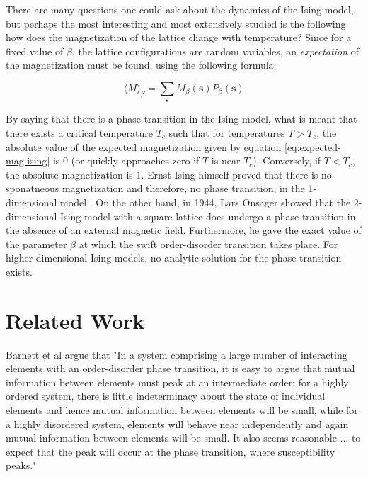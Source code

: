 \documentclass[12pt]{article}
\begin{document}
There are many questions one could ask about the dynamics of the Ising model, but perhaps the most interesting and most extensively studied is the following: how does the magnetization of the lattice change with temperature? Since for a fixed value of $\beta$, the lattice configurations are random variables, an \textit{expectation} of the magnetization must be found, using the following formula:

\begin{equation}
\langle M \rangle_\beta = \sum_{\boldsymbol{s}} M_\beta(\boldsymbol{s}) P_\beta(\boldsymbol{s})
\label{eq:expected-mag-ising}
\end{equation}

By saying that there is a phase transition in the Ising model, what is meant that there exists a critical temperature $T_c$ such that for temperatures $T > T_c$, the absolute value of the expected magnetization given by equation \ref{eq:expected-mag-ising} is 0 (or quickly approaches zero if $T$ is near $T_c$). Conversely, if $T < T_c$, the absolute magnetization is 1. Ernst Ising himself proved that there is no sponatneous magnetization and therefore, no phase transition, in the 1-dimensional model \cite{Ising1925}. On the other hand, in 1944, Lars Onsager showed \cite{lars-onsanger} that the 2-dimensional Ising model with a square lattice does undergo a phase transition in the absence of an external magnetic field. Furthermore, he gave the exact value of the parameter $\beta$ at which the swift order-disorder transition takes place. For higher dimensional Ising models, no analytic solution for the phase transition exists. 

\newpage
\section{Related Work} 

Barnett et al \cite{barnett-ising} argue that "In a system comprising a large number of interacting elements with an order-disorder phase transition, it is easy to argue that mutual information between elements must peak at an intermediate order: for a highly ordered system, there is little indeterminacy about the state of individual elements and hence mutual information between elements will be small, while for a highly disordered system, elements will behave near independently and again mutual information between elements will be small. It also seems reasonable ... to expect that the peak will occur at the phase transition, where susceptibility peaks."
\end{document}
